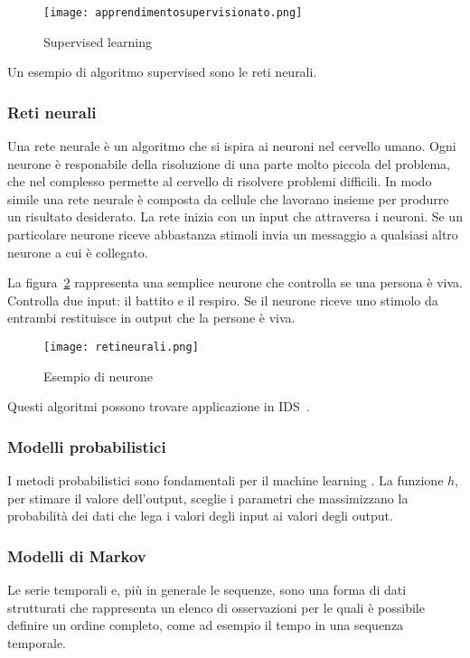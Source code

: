 \documentclass[../main.tex]{subfiles}
\begin{document}
\begin{figure}[H]
				\centering
				\texttt{[image: apprendimentosupervisionato.png]}
				\caption{Supervised learning}
				\label{fig:supervisedLearning}
\end{figure}

Un esempio di algoritmo supervised sono le reti neurali.
\subsubsection{Reti neurali}
Una rete neurale è un algoritmo che si ispira ai neuroni nel cervello umano. Ogni neurone è responabile della risoluzione di una parte molto piccola del problema, che nel complesso permette al cervello di risolvere problemi difficili. In modo simile una rete neurale è composta da cellule che lavorano insieme per produrre un risultato desiderato. La rete inizia con un input che attraversa i neuroni. Se un particolare neurone riceve abbastanza stimoli invia un messaggio a qualsiasi altro neurone a cui è collegato.

La figura~\ref{fig:retineurali} rappresenta una semplice neurone che controlla se una persona è viva. Controlla due input: il battito e il respiro. Se il neurone riceve uno stimolo da entrambi restituisce in output che la persone è viva.

\begin{figure}[H]
				\centering
				\texttt{[image: retineurali.png]}
				\caption{Esempio di neurone}
				\label{fig:retineurali}
\end{figure}

Questi algoritmi possono trovare applicazione in IDS~\cite{reteneuraleids}.

\subsubsection{Modelli probabilistici}
I metodi probabilistici sono fondamentali per il machine learning \cite{compIntelligence}. La funzione $h$, per stimare il valore dell'output, sceglie i parametri che massimizzano la probabilità dei dati che lega i valori degli input ai valori degli output.

\subsubsection{Modelli di Markov}
Le serie temporali e, più in generale le sequenze, sono una forma di dati strutturati che rappresenta un elenco di osservazioni per le quali è possibile definire un ordine completo, come ad esempio il tempo in una sequenza temporale.
\end{document}
